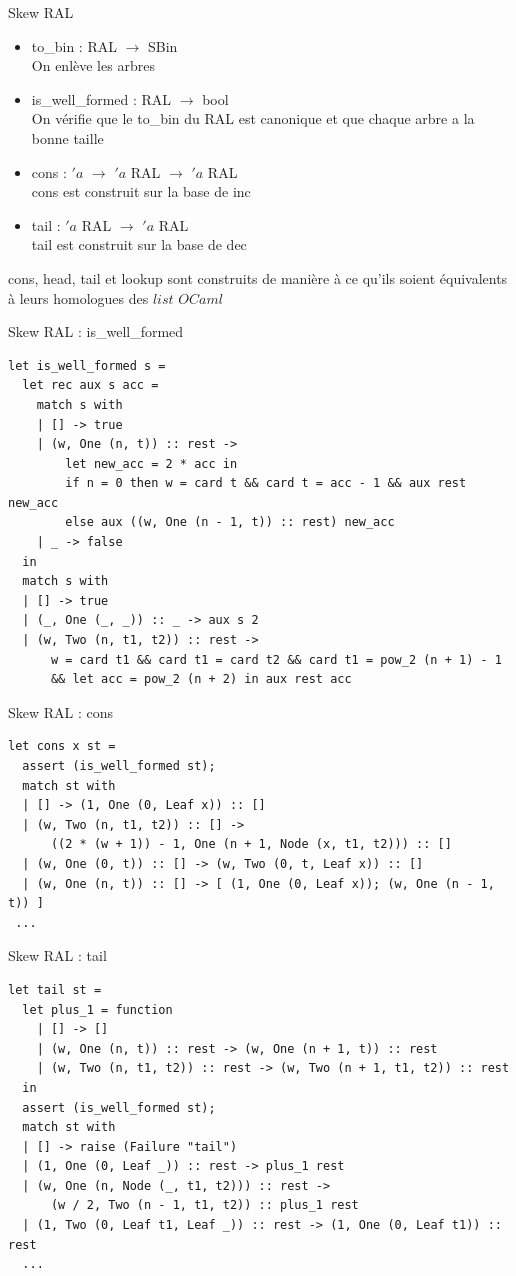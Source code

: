 \documentclass{beamer}
\begin{document}
\begin{frame}{Skew RAL}
\begin{itemize}
    \item to\_bin : RAL $\rightarrow$ SBin\\ On enlève les arbres
    \item is\_well\_formed : RAL $\rightarrow$ bool\\ On vérifie que le to\_bin du RAL est canonique et que chaque arbre a la bonne taille
    \item  cons : $'a$ $\rightarrow$ $'a$ RAL $\rightarrow$ $'a$ RAL\\cons est construit sur la base de inc
    \item tail : $'a$ RAL $\rightarrow$ $'a$ RAL\\tail est construit sur la base de dec
\end{itemize}
cons, head, tail et lookup sont construits de manière à ce qu'ils soient équivalents à leurs homologues des $list$ $OCaml$
\end{frame}

\begin{frame}[fragile]{Skew RAL : is\_well\_formed}
    \begin{lstlisting}
let is_well_formed s =
  let rec aux s acc =
    match s with
    | [] -> true
    | (w, One (n, t)) :: rest ->
        let new_acc = 2 * acc in
        if n = 0 then w = card t && card t = acc - 1 && aux rest new_acc
        else aux ((w, One (n - 1, t)) :: rest) new_acc
    | _ -> false
  in
  match s with
  | [] -> true
  | (_, One (_, _)) :: _ -> aux s 2
  | (w, Two (n, t1, t2)) :: rest ->
      w = card t1 && card t1 = card t2 && card t1 = pow_2 (n + 1) - 1
      && let acc = pow_2 (n + 2) in aux rest acc
\end{lstlisting}
\end{frame}

\begin{frame}[fragile]{Skew RAL : cons}
\begin{lstlisting}
let cons x st =
  assert (is_well_formed st);
  match st with
  | [] -> (1, One (0, Leaf x)) :: []
  | (w, Two (n, t1, t2)) :: [] ->
      ((2 * (w + 1)) - 1, One (n + 1, Node (x, t1, t2))) :: []
  | (w, One (0, t)) :: [] -> (w, Two (0, t, Leaf x)) :: []
  | (w, One (n, t)) :: [] -> [ (1, One (0, Leaf x)); (w, One (n - 1, t)) ]
 ...
\end{lstlisting}
\end{frame}

\begin{frame}[fragile]{Skew RAL : tail}
\begin{lstlisting}
let tail st =
  let plus_1 = function
    | [] -> []
    | (w, One (n, t)) :: rest -> (w, One (n + 1, t)) :: rest
    | (w, Two (n, t1, t2)) :: rest -> (w, Two (n + 1, t1, t2)) :: rest
  in
  assert (is_well_formed st);
  match st with
  | [] -> raise (Failure "tail")
  | (1, One (0, Leaf _)) :: rest -> plus_1 rest
  | (w, One (n, Node (_, t1, t2))) :: rest ->
      (w / 2, Two (n - 1, t1, t2)) :: plus_1 rest
  | (1, Two (0, Leaf t1, Leaf _)) :: rest -> (1, One (0, Leaf t1)) :: rest
  ...
\end{lstlisting}    
\end{frame}
\end{document}
